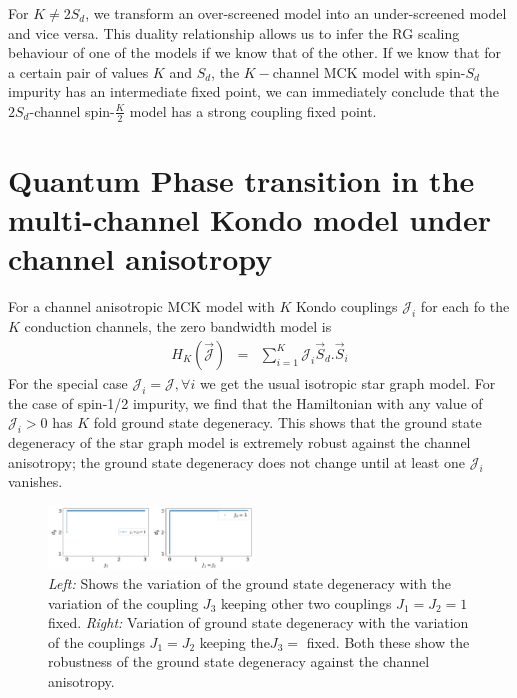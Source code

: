 \documentclass[reprint,prb,superscriptaddress]{revtex4-2}
\begin{document}
For \(K \neq 2S_d\), we transform an over-screened model into an under-screened model and vice versa. This duality relationship allows us to infer the RG scaling behaviour of one of the models if we know that of the other. If we know that for a certain pair of values \(K\) and \(S_d\), the \(K-\)channel MCK model with spin-\(S_d\) impurity has an intermediate fixed point, we can immediately conclude that the \(2S_d\)-channel spin-\(\frac{K}{2}\) model has a strong coupling fixed point.

\section{Quantum Phase transition in the multi-channel Kondo model under channel anisotropy}
\label{anisotropic_rg}

For a channel anisotropic MCK model with \(K\) Kondo couplings \(\mathcal{J}_i\) for each fo the \(K\) conduction channels, the zero bandwidth model is 
\begin{eqnarray}
H_K (\vec{{\mathcal{J}}}) &=& \sum_{i=1}^{K} {\mathcal{J}}_i\vec{S}_d.\vec{S}_i
\label{eq:anisotropy}
\end{eqnarray}
For the special case $\mathcal{J}_i=\mathcal{J}, \forall i$ we get the usual isotropic star graph model. For the case of spin-1/2 impurity, we find that the Hamiltonian with any value of $\mathcal{J}_i>0$ has $K$ fold ground state degeneracy. This shows that the ground state degeneracy of the star graph model is extremely robust against the channel anisotropy; the ground state degeneracy does not change until at least one \(\mathcal{J}_i\) vanishes.
\begin{figure}
\centering
\includegraphics[width=0.48\textwidth]{plt/Anisotropy_Channel_3.png}
\caption{\textit{Left:} Shows the variation of the ground state degeneracy with the variation of the coupling $J_3$ keeping other two couplings $J_1=J_2=1$ fixed. \textit{Right:} Variation of ground state degeneracy with the variation of the couplings $J_1=J_2$ keeping the$J_3=$ fixed. Both these show the robustness of the ground state degeneracy against the channel anisotropy.}
\label{fig:channel-anisotropy-}
\end{figure}
\end{document}

